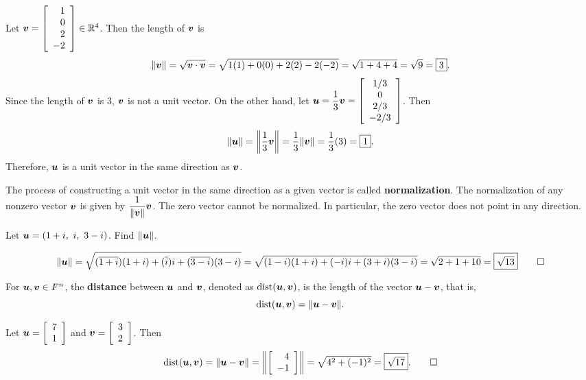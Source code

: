 \begin{Exam} Let $\bb v = \vr{1\\0\\2\\-2} \in \R^4$. Then the length of $\bb v$ is 
\[\Vert \bb v\Vert = \sqrt{\bb v\cdot \bb v} = \sqrt{1(1) + 0(0)+ 2(2) -2(-2) } = \sqrt{1+4+4} = \sqrt{9} = \fbox{$3$}.\] Since the length of $\bb v$ is 3, $\bb v$ is not a unit vector. On the other hand, let $\bb u = \dfrac{1}{3}\bb v = \mtx{c}{1/3\\0\\2/3\\ -2/3}$. Then 
\[\Vert \bb u\Vert = \left\Vert \frac{1}{3} \bb v\right\Vert = \frac{1}{3}\Vert \bb v\Vert = \frac{1}{3}(3) = \fbox{$1$}.\] Therefore, $\bb u$ is a unit vector in the same direction as $\bb v$.
\end{Exam}\vs

The process of constructing a unit vector in the same direction as a given vector is called \textbf{normalization}. The normalization of any nonzero vector $\bb v$ is given by $\dfrac{1}{\Vert \bb v\Vert}\bb v$. The zero vector cannot be normalized. In particular, the zero vector does not point in any direction.\\

\begin{Exam} Let $\bb u = (1+i,\ i,\ 3-i)$. Find  $\Vert \bb u\Vert$.

\[\Vert \bb u\Vert = \sqrt{(\overline{1+i})(1+i) + (\overline{i})i + (\overline{3-i})(3-i)} = \sqrt{ (1-i)(1+i) + (-i)i + (3+i)(3-i)} = \sqrt{2 + 1 + 10} = \fbox{$\sqrt{13}$}\qedhere\]
\end{Exam}\vs

\begin{Def} For $\bb u, \bb v\in F^n$, the \textbf{distance} between $\bb u$ and $\bb v$, denoted as $\dist(\bb u, \bb v)$, is the length of the vector $\bb u -\bb v$, that is, 
\[\dist(\bb u, \bb v) = \Vert \bb u-\bb v\Vert.\]
\end{Def}\vs

\begin{Exam} Let $\bb u = \vr{7\\1}$ and $\bb v = \vr{3\\2}$. Then
\[\dist(\bb u, \bb v) = \Vert \bb u - \bb v\Vert = \left\Vert \vr{4\\-1}\right\Vert = \sqrt{4^2+(-1)^2} = \fbox{$\sqrt{17}$}. \qedhere\]
\end{Exam}\vs

